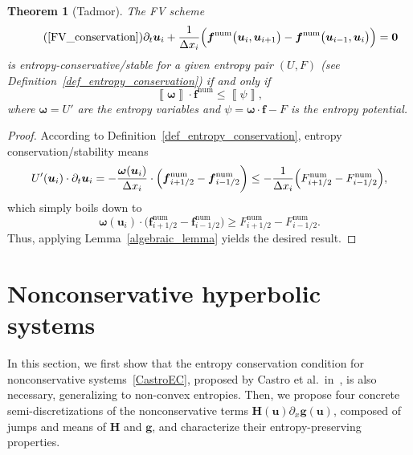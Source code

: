 \documentclass[]{scrartcl}
\renewcommand{\vec}[1]{\boldsymbol{#1}}
\newcommand{\jump}[1]{\left\llbracket #1  \right\rrbracket}
\newtheorem{theorem}{Theorem}[section]
\theoremstyle{definition}
\begin{document}
\begin{theorem}[Tadmor]{\label{tadmor_theorem}}
The FV scheme
\begin{equation}
\tag{\ref{FV_conservation}}
	\partial_t \vec{u}_i + \frac{1}{\Delta x_i} \Bigl ( \vec{f}^{\mathrm{num}}\bigl ( \vec{u}_{i}, \vec{u}_{i+1} \bigr )  - \vec{f}^{\mathrm{num}}\bigl ( \vec{u}_{i-1}, \vec{u}_{i} \bigr ) \Bigr ) = \vec{0}
\end{equation}
is entropy-conservative/stable for a given entropy pair $(U, F)$ (see Definition~\ref{def_entropy_conservation}) if and only if
\\
\begin{equation}
\label{TadmorDef}
	\jump{\vec{\omega}} \cdot \vec{f}^\mathrm{num} \leq \jump{\psi},
\end{equation}
where $\vec{\omega} = U'$ are the entropy variables and $\psi = \vec{\omega} \cdot \vec{f} - F$ is the entropy potential.
\end{theorem}
\begin{proof}
According to Definition~\ref{def_entropy_conservation}, entropy conservation/stability means
\begin{equation}
U'(\vec{u}_i) \cdot \partial_t \vec{u}_i = -\frac{\vec{\omega}(\vec{u}_i)}{\Delta x_i}\cdot  \Bigl ( \vec{f}^\mathrm{num}_{i+1/2} - \vec{f}^\mathrm{num}_{i-1/2} \bigg ) \leq -\frac{1}{\Delta x_i} \Bigl ( F^{\mathrm{num}}_{i+1/2} - F^{\mathrm{num}}_{i-1/2} \Bigr ),
\end{equation}
which simply boils down to
\begin{equation}
\vec{\omega}(\vec{u}_i) \cdot \bigg ( \vec{f}^\mathrm{num}_{i+1/2} - \vec{f}^\mathrm{num}_{i-1/2} \bigg ) \geq F^{\mathrm{num}}_{i+1/2} - F^{\mathrm{num}}_{i-1/2}.
\end{equation}
Thus, applying Lemma~\ref{algebraic_lemma} yields the desired result.
\end{proof}
\section{Nonconservative hyperbolic systems}
\label{sec:nonconservative_systems}
In this section, we first show that the entropy conservation condition for nonconservative systems~\eqref{CastroEC}, proposed by Castro et al.\ in~\cite[Theorem~2.1]{Castro2013}, is also necessary, generalizing to non-convex entropies.
Then, we propose four concrete semi-discretizations of the nonconservative terms $\vec{H}(\vec{u})\partial_x \vec{g}(\vec{u})$, composed of jumps and means of $\vec{H}$ and $\vec{g}$, and characterize their entropy-preserving properties.
\end{document}
